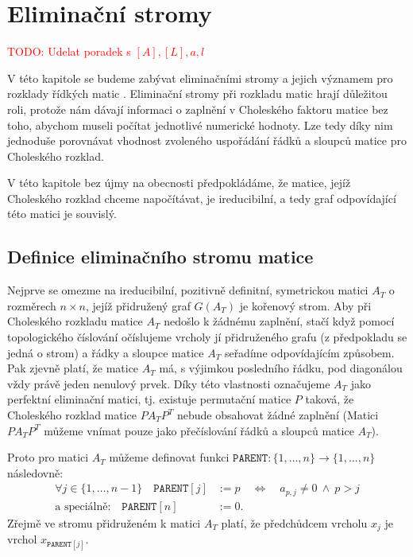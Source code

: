 \documentclass[11pt,american,czech,oneside]{book}
\theoremstyle{plain}
\theoremstyle{definition}
\newcommand{\TODO}[1]{\textcolor{red}{TODO: #1}\PackageWarning{TODO:}{TODO: #1!}}
\begin{document}
\section{Eliminační stromy}

\TODO{Udelat poradek s $[A],[L],a,l$}

V této kapitole se budeme zabývat eliminačními stromy a jejich významem pro rozklady řídkých matic \cite{liu:86,liu:90}. Eliminační stromy při rozkladu matic hrají důležitou roli, protože nám dávají informaci o zaplnění v Choleského faktoru matice bez toho, abychom museli počítat jednotlivé numerické hodnoty. Lze tedy díky nim jednoduše porovnávat vhodnost zvoleného uspořádání řádků a sloupců matice pro Choleského rozklad.

V této kapitole bez újmy na obecnosti předpokládáme, že matice, jejíž Choleského rozklad chceme napočítávat, je ireducibilní, a tedy graf odpovídající této matici je souvislý.

\subsection{Definice eliminačního stromu matice}

Nejprve se omezme na ireducibilní, pozitivně definitní, symetrickou matici $A_T$ o rozměrech $n \times n$, jejíž přidružený graf $G(A_T)$ je kořenový strom. Aby při Choleského rozkladu matice $A_T$ nedošlo k žádnému zaplnění, stačí když pomocí topologického číslování očíslujeme vrcholy jí přidruženého grafu (z předpokladu se jedná o strom) a řádky a sloupce matice $A_T$ seřadíme odpovídajícím způsobem. Pak zjevně platí, že matice $A_T$ má, s výjimkou posledního řádku, pod diagonálou vždy právě jeden nenulový prvek. Díky této vlastnosti označujeme $A_T$ jako perfektní eliminační matici, tj. existuje permutační matice $P$ taková, že Choleského rozklad matice $PA_TP^T$ nebude obsahovat žádné zaplnění \cite{rose:72} (Matici $PA_TP^T$ můžeme vnímat pouze jako přečíslování řádků a sloupců matice $A_T$). 

Proto pro matici $A_T$ můžeme definovat funkci $\texttt{PARENT}:\{1,\ldots,n\} \rightarrow \{1,\ldots,n\}$ následovně:
\begin{align*}
  \forall j \in \{1,\ldots,n-1\} \quad \texttt{PARENT}[j] & := p \quad \Leftrightarrow \quad a_{p,j} \neq 0 \ \wedge \ p > j \\
  \text{a speciálně:} \quad \texttt{PARENT}[n] & := 0.
\end{align*}
Zřejmě ve stromu přidruženém k matici $A_T$ platí, že předchůdcem vrcholu $x_j$ je vrchol $x_{\texttt{PARENT}[j]}$.
\end{document}

